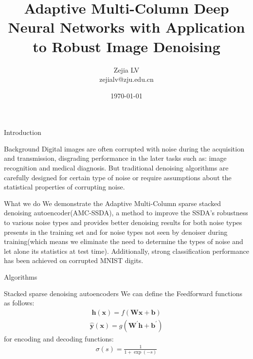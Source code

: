 \documentclass[notes]{beamer}
\title[adalimumab]{Adaptive Multi-Column Deep Neural Networks with Application to Robust Image Denoising}
\author[Zejia LV]{Zejia LV \\ zejialv@zju.edu.cn}
\date[\today]{\today}
\begin{document}
\begin{frame}
	\titlepage
\end{frame}


\begin{frame}{Introduction}
	\begin{block}{Background}
		Digital images are often corrupted with noise during the acquisition and transmission, disgrading performance in the later tasks such as: image recognition and medical diagnosis. But traditional denoising algorithms are carefully designed for certain type of noise or require assumptions about the statistical properties of corrupting noise.	
	\end{block}	
	\begin{block}{What we do}
		We demonstrate the Adaptive Multi-Column sparse stacked denoising autoencoder(AMC-SSDA), a method to improve the SSDA's robustness to various noise types and provides better denoising results for both noise types presents in the training set and for noise types not seen by denoiser during training(which means we eliminate the need to determine the types of noise and let alone its statistics at test time). Additionally, strong classification performance has been achieved on corrupted MNIST digits.
	\end{block}
\end{frame}

\begin{frame}{Algorithms}
	\begin{block}{Stacked sparse denoising autoencoders}
	 We can define the Feedforward functions as follows:
		\begin{equation}
			\begin{split}
				\mathbf { h } ( \mathbf { x } ) = f ( \mathbf { W } \mathbf { x } + \mathbf { b } )
			\end{split}
		\end{equation}
		\begin{equation}
			\begin{split}
				\hat { \mathbf { y } } ( \mathbf { x } ) = g \left( \mathbf { W } ^ { \prime } \mathbf { h } + \mathbf { b } ^ { \prime } \right)
			\end{split}
		\end{equation}
		for encoding and decoding functions:
		\begin{equation}
			\begin{split}
				\sigma ( s ) = \frac { 1 } { 1 + \exp ( - s ) }
			\end{split}
		\end{equation}
		
	\end{block}
\end{frame}
\end{document}
